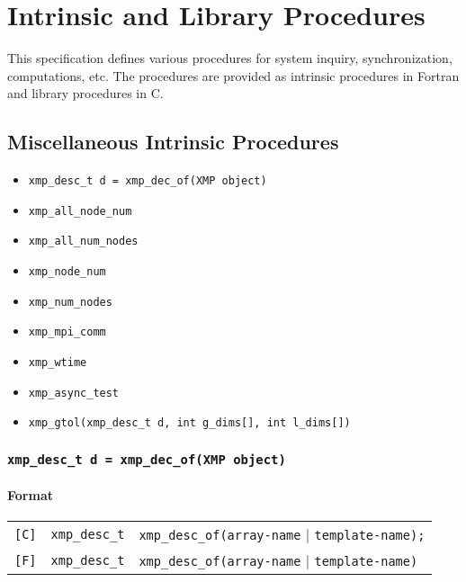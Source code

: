 \chapter{Intrinsic and Library Procedures}
\label{chap:Intrinsic and library procedures}

This specification defines various procedures for system inquiry,
synchronization, computations, etc. The procedures are provided as
intrinsic procedures in Fortran and library procedures in C.

\section{Miscellaneous Intrinsic Procedures}

\begin{itemize}
 \item {\tt xmp\_desc\_t d = xmp\_dec\_of(XMP object)}
 \item {\tt xmp\_all\_node\_num}
 \item {\tt xmp\_all\_num\_nodes}
 \item {\tt xmp\_node\_num}
 \item {\tt xmp\_num\_nodes}
 \item {\tt xmp\_mpi\_comm}
 \item {\tt xmp\_wtime}
 \item {\tt xmp\_async\_test}
 \item {\tt xmp\_gtol(xmp\_desc\_t d, int g\_dims[], int l\_dims[])}
\end{itemize}

\vspace{0.3cm}

\subsection{\tt xmp\_desc\_t d = xmp\_dec\_of(XMP object)}

\subsubsection*{Format}

\begin{tabular}{lll}

\verb![C]!&  {\tt xmp\_desc\_t}& {\tt xmp\_desc\_of(array-name} $\vert$ {\tt template-name);}\\

\verb![F]!&  {\tt xmp\_desc\_t}& {\tt xmp\_desc\_of(array-name} $\vert$ {\tt template-name)}
\end{tabular}

